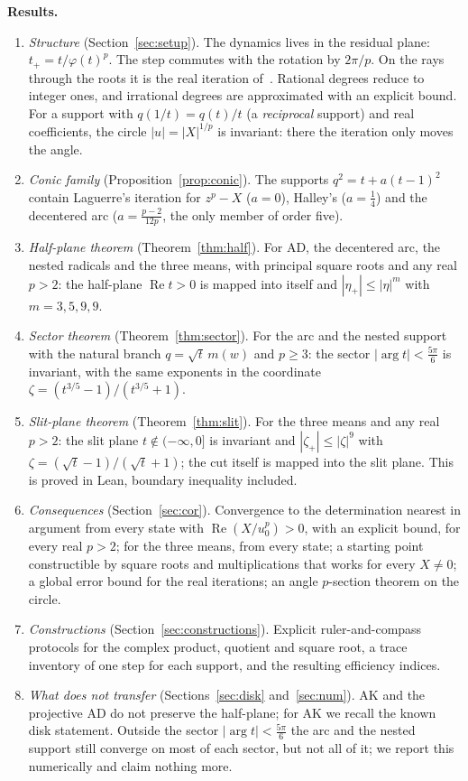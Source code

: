 \documentclass[10pt,a4paper]{article}
\theoremstyle{plain}
\theoremstyle{remark}
\numberwithin{equation}{section}
\DeclareMathOperator{\re}{Re}\DeclareMathOperator{\im}{Im}
\begin{document}
\textbf{Results.}
\begin{enumerate}
\item \emph{Structure} (Section~\ref{sec:setup}). The dynamics lives in the residual plane:
  $t_+=t/\varphi(t)^{p}$. The step commutes with the rotation by $2\pi/p$. On the rays through the
  roots it is the real iteration of~\cite{v28}. Rational degrees reduce to integer ones, and
  irrational degrees are approximated with an explicit bound. For a support with
  $q(1/t)=q(t)/t$ (a \emph{reciprocal} support) and real coefficients, the circle $|u|=|X|^{1/p}$
  is invariant: there the iteration only moves the angle.
\item \emph{Conic family} (Proposition~\ref{prop:conic}). The supports $q^{2}=t+a(t-1)^{2}$ contain
  Laguerre's iteration for $z^{p}-X$ ($a=0$), Halley's ($a=\tfrac14$) and the decentered arc
  ($a=\frac{p-2}{12p}$, the only member of order five).
\item \emph{Half-plane theorem} (Theorem~\ref{thm:half}). For AD, the decentered arc, the nested
  radicals and the three means, with principal square roots and any real $p>2$: the half-plane
  $\re t>0$ is mapped into itself and $|\eta_+|\le|\eta|^{m}$ with $m=3,5,9,9$.
\item \emph{Sector theorem} (Theorem~\ref{thm:sector}). For the arc and the nested support with the
  natural branch $q=\sqrt t\,m(w)$ and $p\ge3$: the sector $|\arg t|<\frac{5\pi}6$ is invariant, with
  the same exponents in the coordinate $\zeta=(t^{3/5}-1)/(t^{3/5}+1)$.
\item \emph{Slit-plane theorem} (Theorem~\ref{thm:slit}). For the three means and any real $p>2$:
  the slit plane $t\notin(-\infty,0]$ is invariant and $|\zeta_+|\le|\zeta|^{9}$ with
  $\zeta=(\sqrt t-1)/(\sqrt t+1)$; the cut itself is mapped into the slit plane. This is proved in
  Lean, boundary inequality included.
\item \emph{Consequences} (Section~\ref{sec:cor}). Convergence to the determination nearest in
  argument from every state with $\re(X/u_0^{p})>0$, with an explicit bound, for every real $p>2$;
  for the three means, from every state;
  a starting point constructible by square roots and multiplications that works for every
  $X\neq0$; a global error bound for the real
  iterations; an angle $p$-section theorem on the circle.
\item \emph{Constructions} (Section~\ref{sec:constructions}). Explicit ruler-and-compass protocols
  for the complex product, quotient and square root, a trace inventory of one step for each support,
  and the resulting efficiency indices.
\item \emph{What does not transfer} (Sections~\ref{sec:disk} and~\ref{sec:num}). AK and the
  projective AD do not preserve the half-plane; for AK we recall the known disk statement. Outside
  the sector $|\arg t|<\frac{5\pi}6$ the arc and the nested support still converge on most of each
  sector, but not all of it; we report this numerically and claim nothing more.
\end{enumerate}
\end{document}
